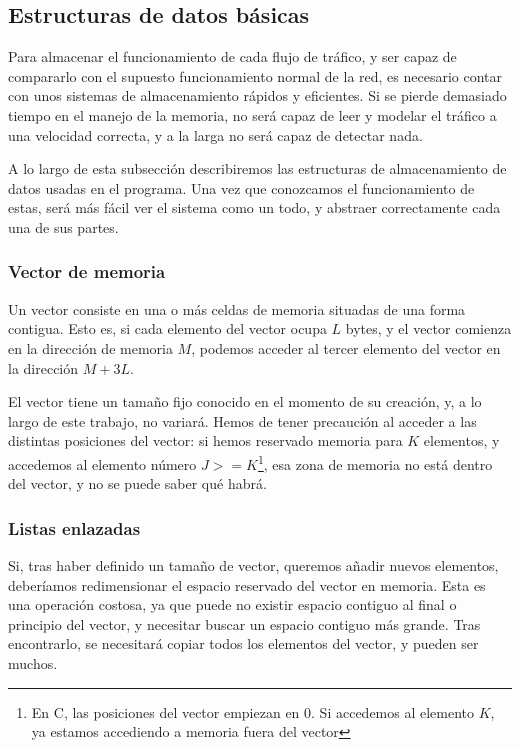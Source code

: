 \subsection{Estructuras de datos básicas}
Para almacenar el funcionamiento de cada flujo de tráfico, y ser capaz de compararlo con el supuesto funcionamiento 
normal de la red, es necesario contar con unos sistemas de almacenamiento rápidos y eficientes. Si se pierde demasiado 
tiempo en el manejo de la memoria, \redborderddos{} no será capaz de leer y modelar el tráfico a una velocidad 
correcta, y a la larga no será capaz de detectar nada.

A lo largo de esta subsección describiremos las estructuras de almacenamiento de datos usadas en el programa. Una vez 
que conozcamos el funcionamiento de estas, será más fácil ver el sistema como un todo, y abstraer correctamente cada 
una de sus partes.

\subsubsection{Vector de memoria}
Un vector consiste en una o más celdas de memoria situadas de una forma contigua. Esto es, si cada elemento del vector 
ocupa $L$ bytes, y el vector comienza en la dirección de memoria $M$, podemos acceder al tercer elemento del vector en 
la dirección $M+3L$.

El vector tiene un tamaño fijo conocido en el momento de su creación, y, a lo largo de este trabajo, no variará. Hemos 
de tener precaución al acceder a las distintas posiciones del vector: si hemos reservado memoria para $K$ elementos, y 
accedemos al elemento número $J>=K$\footnote{En C, las posiciones del vector empiezan en 0. Si accedemos al elemento 
$K$, ya estamos accediendo a memoria fuera del vector}, esa zona de memoria no está dentro del vector, y no se puede 
saber qué habrá.

\subsubsection{Listas enlazadas}
Si, tras haber definido un tamaño de vector, queremos añadir nuevos elementos, deberíamos redimensionar el espacio 
reservado del vector en memoria. Esta es una operación costosa, ya que puede no existir espacio contiguo al final o 
principio del vector, y necesitar buscar un espacio contiguo más grande. Tras encontrarlo, se necesitará copiar todos 
los elementos del vector, y pueden ser muchos.

